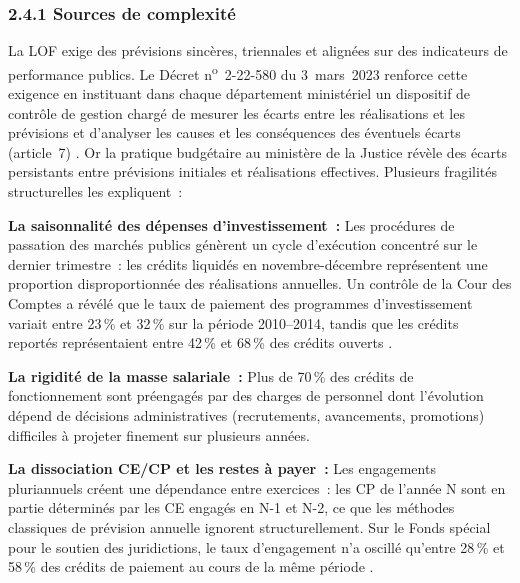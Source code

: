 \subsubsection*{2.4.1 \quad Sources de complexit\'e}

La LOF exige des pr\'evisions sinc\`eres, triennales et align\'ees sur des indicateurs de performance publics. Le D\'ecret n\textsuperscript{o}~2-22-580 du 3~mars~2023 renforce cette exigence en instituant dans chaque d\'epartement minist\'eriel un dispositif de contr\^ole de gestion charg\'e de \og{}mesurer les \'ecarts entre les r\'ealisations et les pr\'evisions et d'analyser les causes et les cons\'equences des \'eventuels \'ecarts\fg{} (article~7) \citep{DecretCDG2023}. Or la pratique budg\'etaire au minist\`ere de la Justice r\'ev\`ele des \'ecarts persistants entre pr\'evisions initiales et r\'ealisations effectives. Plusieurs fragilit\'es structurelles les expliquent~:

\textbf{La saisonnalit\'e des d\'epenses d'investissement~:} Les proc\'edures de passation des march\'es publics g\'en\`erent un cycle d'ex\'ecution concentr\'e sur le dernier trimestre~: les cr\'edits liquid\'es en novembre-d\'ecembre repr\'esentent une proportion disproportionn\'ee des r\'ealisations annuelles. Un contr\^ole de la Cour des Comptes a r\'ev\'el\'e que le taux de paiement des programmes d'investissement variait entre 23\,\% et 32\,\% sur la p\'eriode 2010--2014, tandis que les cr\'edits report\'es repr\'esentaient entre 42\,\% et 68\,\% des cr\'edits ouverts \citep{CourDesComptes2016}.

\textbf{La rigidit\'e de la masse salariale~:} Plus de 70\,\% des cr\'edits de fonctionnement sont pr\'eengag\'es par des charges de personnel dont l'\'evolution d\'epend de d\'ecisions administratives (recrutements, avancements, promotions) difficiles \`a projeter finement sur plusieurs ann\'ees.

\textbf{La dissociation CE/CP et les restes \`a payer~:} Les engagements pluriannuels cr\'eent une d\'ependance entre exercices~: les CP de l'ann\'ee N sont en partie d\'etermin\'es par les CE engag\'es en N-1 et N-2, ce que les m\'ethodes classiques de pr\'evision annuelle ignorent structurellement. Sur le Fonds sp\'ecial pour le soutien des juridictions, le taux d'engagement n'a oscill\'e qu'entre 28\,\% et 58\,\% des cr\'edits de paiement au cours de la m\^eme p\'eriode \citep{CourDesComptes2016}.

